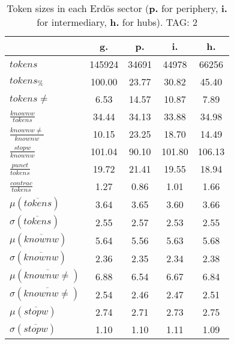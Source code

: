\begin{table}[h!]
\begin{center}
\begin{tabular}{| l || c | c | c | c |}\hline
 & {\bf g.} & {\bf p.} & {\bf i.} & {\bf h.} \\\hline\hline
$tokens$ & 145924  & 34691  & 44978  & 66256 \\
$tokens_{\%}$ & 100.00  & 23.77  & 30.82  & 45.40 \\
$tokens \neq$ & 6.53  & 14.57  & 10.87  & 7.89 \\\hline
$\frac{knownw}{tokens}$ & 34.44  & 34.13  & 33.88  & 34.98 \\
$\frac{knownw \neq}{knownw}$ & 10.15  & 23.25  & 18.70  & 14.49 \\\hline
$\frac{stopw}{knownw}$ & 101.04  & 90.10  & 101.80  & 106.13 \\
$\frac{punct}{tokens}$ & 19.72  & 21.41  & 19.55  & 18.94 \\
$\frac{contrac}{tokens}$ & 1.27  & 0.86  & 1.01  & 1.66 \\\hline\hline
$\mu(\overline{tokens})$ & 3.64  & 3.65  & 3.60  & 3.66 \\
$\sigma(\overline{tokens})$ & 2.55  & 2.57  & 2.53  & 2.55 \\\hline
$\mu(\overline{knownw})$ & 5.64  & 5.56  & 5.63  & 5.68 \\
$\sigma(\overline{knownw})$ & 2.36  & 2.35  & 2.34  & 2.38 \\\hline
$\mu(\overline{knownw \neq})$ & 6.88  & 6.54  & 6.67  & 6.84 \\
$\sigma(\overline{knownw \neq})$ & 2.54  & 2.46  & 2.47  & 2.51 \\\hline
$\mu(\overline{stopw})$ & 2.74  & 2.71  & 2.73  & 2.75 \\
$\sigma(\overline{stopw})$ & 1.10  & 1.10  & 1.11  & 1.09 \\\hline
\end{tabular}
\caption{Token sizes in each Erd\"os sector ({{\bf p.}} for periphery, {{\bf i.}} for intermediary, {{\bf h.}} for hubs). TAG: 2}
\end{center}
\end{table}